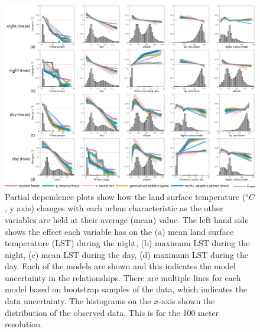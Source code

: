\documentclass[final,3p,times,twocolumn,sort&compress]{elsarticle}
\begin{document}
\begin{figure}[h]
    \centering
    \includegraphics[width=\linewidth]{fig/report/pdp_100.png}
    \caption[Partial dependence plots for LST at 100 meter resolution]{
    Partial dependence plots show how the land surface temperature ($^oC$, y axis) changes with each urban characteristic as the other variables are held at their average (mean) value. 
    The left hand side shows the effect each variable has on the (a) mean land surface temperature (LST) during the night, (b) maximum LST during the night, (c) mean LST during the day, (d) maximum LST during the day. 
    Each of the models are shown and this indicates the model uncertainty in the relationships.
    There are multiple lines for each model based on bootstrap samples of the data, which indicates the data uncertainty.
    The histograms on the $x$-axis shown the distribution of the observed data.
    This is for the 100 meter resolution.
    }
    \label{fig:pdp_100}
\end{figure}
\end{document}

